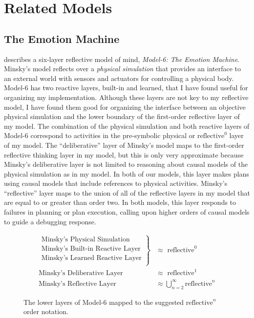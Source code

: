 \chapter{Related Models}
\label{chapter:related_models}

\section{The Emotion Machine}
\label{backreference:self_reflective_self_conscious}

\cite{minsky:2006} describes a six-layer reflective model of mind,
\emph{{\mbox{Model-6}}: The Emotion Machine}.  Minsky's model reflects
over a \emph{physical simulation} that provides an interface to an
external world with sensors and actuators for controlling a physical
body.  {\mbox{Model-6}} has two reactive layers, built-in and learned,
that I have found useful for organizing my implementation.  Although
these layers are not key to my reflective model, I have found them
good for organizing the interface between an objective physical
simulation and the lower boundary of the first-order reflective layer
of my model.  The combination of the physical simulation and both
reactive layers of {\mbox{Model-6}} correspond to activities in the
pre-symbolic physical or $\text{reflective}^0$ layer of my model.  The
``deliberative'' layer of Minsky's model maps to the first-order
reflective thinking layer in my model, but this is only very
approximate because Minsky's deliberative layer is not limited to
reasoning about causal models of the physical simulation as in my
model.  In both of our models, this layer makes plans using causal
models that include references to physical activities.  Minsky's
``reflective'' layer maps to the union of all of the reflective layers
in my model that are equal to or greater than order two.  In both
models, this layer responds to failures in planning or plan execution,
calling upon higher orders of causal models to guide a debugging
response.

\begin{figure}[bth]
\begin{align*}
\left.
  \begin{array}{l}
    \text{Minsky's Physical Simulation}\\
    \text{Minsky's Built-in Reactive Layer}\\
    \text{Minsky's Learned Reactive Layer}\\
  \end{array}
\right\}                            &{\approx} \text{ reflective}^0 \\
\text{Minsky's Deliberative Layer } &{\approx} \text{ reflective}^1 \\
\text{Minsky's Reflective Layer }   &{\approx} \bigcup_{n=2}^{\infty}{\text{reflective}^n}
\end{align*}
\caption{The lower layers of Model-6 mapped to the suggested
  $\text{reflective}^n$ order notation.}
\label{figure:model_6_as_reflective_order_notation}
\end{figure}

